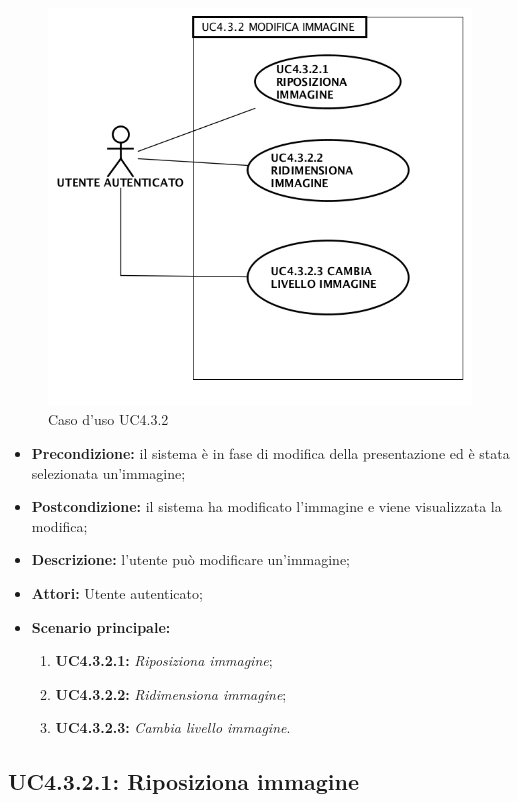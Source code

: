 \begin{figure}[h]
	\begin{center}
	\includegraphics[scale=0.4]{diagram/UC4-3-2.png}
	\caption{Caso d'uso UC4.3.2}
	\end{center}
\end{figure}
\begin{itemize}
	\item \textbf{Precondizione:} il sistema è in fase di modifica della presentazione ed è stata selezionata un'immagine;
	\item \textbf{Postcondizione:} il sistema ha modificato l'immagine e viene visualizzata la modifica;
	\item \textbf{Descrizione:} l'utente può modificare un'immagine;
	\item \textbf{Attori:} Utente autenticato;
	\item \textbf{Scenario principale:}
	\begin{enumerate}
		\item \textbf{ UC4.3.2.1:} \textit{ Riposiziona immagine};
		\item \textbf{ UC4.3.2.2:} \textit{ Ridimensiona immagine};
		\item \textbf{ UC4.3.2.3:} \textit{ Cambia livello immagine}.
	\end{enumerate}
\end{itemize}
\subsection{ UC4.3.2.1: Riposiziona immagine}

